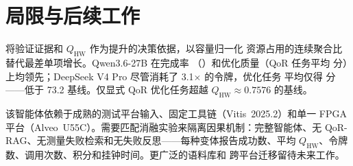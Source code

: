 \section{局限与后续工作}

\VCL{} 将验证证据和 $Q_{\mathrm{HW}}$ 作为提升的决策依据，以容量归一化
资源占用的连续聚合比替代最差单项增长。Qwen3.6-27B 在完成率
（\QwenThreeSixSuccessRate）和优化质量（QoR 任务平均 \QwenThreeSixQorScore{}
分）上均领先；DeepSeek V4 Pro 尽管消耗了 3.1$\times$ 的令牌，优化任务
平均仅得 \DeepSeekQorScore{} 分——低于 73.2 基线。仅显式 QoR 优化任务超越
$Q_{\mathrm{HW}}{\approx}0.7576$ 的基线。

该智能体依赖于成熟的测试平台输入、固定工具链（Vitis~2025.2）和单一 FPGA
平台（Alveo~U55C）。需要匹配消融实验来隔离因果机制：完整智能体、无
QoR-RAG、无测量失败检索和无失败反思——每种变体报告成功数、平均
$Q_{\mathrm{HW}}$、令牌数、调用次数、积分和挂钟时间。更广泛的语料库和
跨平台迁移留待未来工作。
